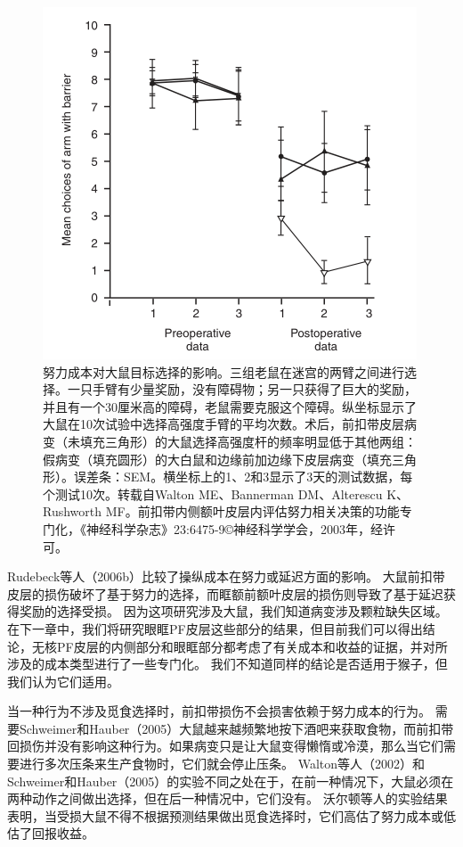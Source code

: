 \begin{figure}[!htb]
	\centering
	\includegraphics{image_pfc/Fig_3_7}
	\caption{努力成本对大鼠目标选择的影响。三组老鼠在迷宫的两臂之间进行选择。一只手臂有少量奖励，没有障碍物；另一只获得了巨大的奖励，并且有一个30厘米高的障碍，老鼠需要克服这个障碍。纵坐标显示了大鼠在10次试验中选择高强度手臂的平均次数。术后，前扣带皮层病变（未填充三角形）的大鼠选择高强度杆的频率明显低于其他两组：假病变（填充圆形）的大白鼠和边缘前加边缘下皮层病变（填充三角形）。误差条：SEM。横坐标上的1、2和3显示了3天的测试数据，每个测试10次。转载自Walton ME、Bannerman DM、Alterescu K、Rushworth MF。前扣带内侧额叶皮层内评估努力相关决策的功能专门化，《神经科学杂志》23:6475-9©神经科学学会，2003年，经许可。}
	\label{fig:fig}
\end{figure}


Rudebeck等人（2006b）比较了操纵成本在努力或延迟方面的影响。
大鼠前扣带皮层的损伤破坏了基于努力的选择，而眶额前额叶皮层的损伤则导致了基于延迟获得奖励的选择受损。
因为这项研究涉及大鼠，我们知道病变涉及颗粒缺失区域。
在下一章中，我们将研究眼眶PF皮层这些部分的结果，但目前我们可以得出结论，无核PF皮层的内侧部分和眼眶部分都考虑了有关成本和收益的证据，并对所涉及的成本类型进行了一些专门化。
我们不知道同样的结论是否适用于猴子，但我们认为它们适用。\par


当一种行为不涉及觅食选择时，前扣带损伤不会损害依赖于努力成本的行为。
需要Schweimer和Hauber（2005）大鼠越来越频繁地按下酒吧来获取食物，而前扣带回损伤并没有影响这种行为。如果病变只是让大鼠变得懒惰或冷漠，那么当它们需要进行多次压条来生产食物时，它们就会停止压条。
Walton等人（2002）和Schweimer和Hauber（2005）的实验不同之处在于，在前一种情况下，大鼠必须在两种动作之间做出选择，但在后一种情况中，它们没有。
沃尔顿等人的实验结果表明，当受损大鼠不得不根据预测结果做出觅食选择时，它们高估了努力成本或低估了回报收益。\par



